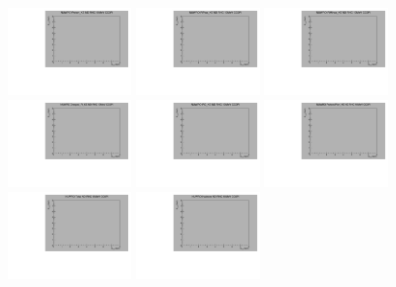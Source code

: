 \begin{center}

  \includegraphics[width=0.245\textwidth]{plots/response_matrix/Proton_KE_RHC_CC0Pi_10MeV.pdf}
  \includegraphics[width=0.245\textwidth]{plots/response_matrix/PiPlus_KE_RHC_CC0Pi_10MeV.pdf}
  \includegraphics[width=0.245\textwidth]{plots/response_matrix/PiMinus_KE_RHC_CC0Pi_10MeV.pdf}
  \includegraphics[width=0.245\textwidth]{plots/response_matrix/Charged_Pi_KE_RHC_CC0Pi_10MeV.pdf}
  \includegraphics[width=0.245\textwidth]{plots/response_matrix/Pi0_KE_RHC_CC0Pi_10MeV.pdf}
  \includegraphics[width=0.245\textwidth]{plots/response_matrix/Proton+Pion_KE_RHC_CC0Pi_10MeV.pdf}
  \includegraphics[width=0.245\textwidth]{plots/response_matrix/Total_RHC_CC0Pi_10MeV.pdf}
  \includegraphics[width=0.245\textwidth]{plots/response_matrix/Hadrons_RHC_CC0Pi_10MeV.pdf}

\end{center}

